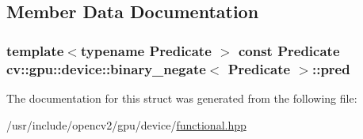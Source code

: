 \subsection{Member Data Documentation}
\hypertarget{structcv_1_1gpu_1_1device_1_1binary__negate_abda3894cd4ecc6fe0f490fb7b9fc4cd3}{
\subsubsection[{pred}]{\setlength{\rightskip}{0pt plus 5cm}template$<$typename Predicate $>$ const Predicate {\bf cv\-::gpu\-::device\-::binary\-\_\-negate}$<$ Predicate $>$\-::pred}}\label{structcv_1_1gpu_1_1device_1_1binary__negate_abda3894cd4ecc6fe0f490fb7b9fc4cd3}


The documentation for this struct was generated from the following file\-:\begin{DoxyCompactItemize}
\item 
/usr/include/opencv2/gpu/device/\hyperlink{functional_8hpp}{functional.\-hpp}\end{DoxyCompactItemize}
